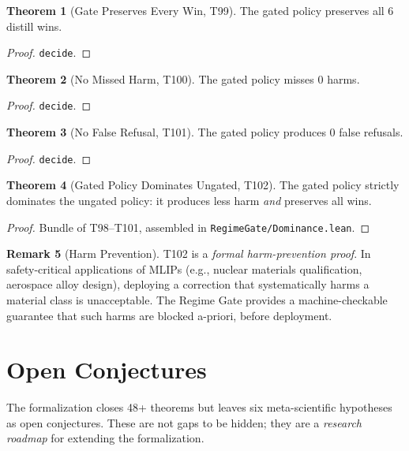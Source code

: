 \documentclass[11pt,a4paper]{article}
\theoremstyle{definition}
\newtheorem{theorem}{Theorem}[section]
\newtheorem{remark}[theorem]{Remark}
\theoremstyle{plain}
\begin{document}
\begin{theorem}[Gate Preserves Every Win, T99]
\label{thm:preserveswin}
The gated policy preserves all 6 distill wins.
\end{theorem}
\begin{proof}
\texttt{decide}.
\end{proof}

\begin{theorem}[No Missed Harm, T100]
\label{thm:nomissed}
The gated policy misses 0 harms.
\end{theorem}
\begin{proof}
\texttt{decide}.
\end{proof}

\begin{theorem}[No False Refusal, T101]
\label{thm:nofalse}
The gated policy produces 0 false refusals.
\end{theorem}
\begin{proof}
\texttt{decide}.
\end{proof}

\begin{theorem}[Gated Policy Dominates Ungated, T102]
\label{thm:dominance}
The gated policy strictly dominates the ungated policy: it produces less harm \emph{and} preserves all wins.
\end{theorem}
\begin{proof}
Bundle of T98--T101, assembled in \texttt{RegimeGate/Dominance.lean}.
\end{proof}

\begin{remark}[Harm Prevention]
\label{rem:harm}
T102 is a \emph{formal harm-prevention proof}. In safety-critical applications of MLIPs (e.g., nuclear materials qualification, aerospace alloy design), deploying a correction that systematically harms a material class is unacceptable. The Regime Gate provides a machine-checkable guarantee that such harms are blocked a-priori, before deployment.
\end{remark}

\section{Open Conjectures}
\label{sec:conjectures}

The formalization closes 48+ theorems but leaves six meta-scientific hypotheses as open conjectures. These are not gaps to be hidden; they are a \emph{research roadmap} for extending the formalization.
\end{document}
